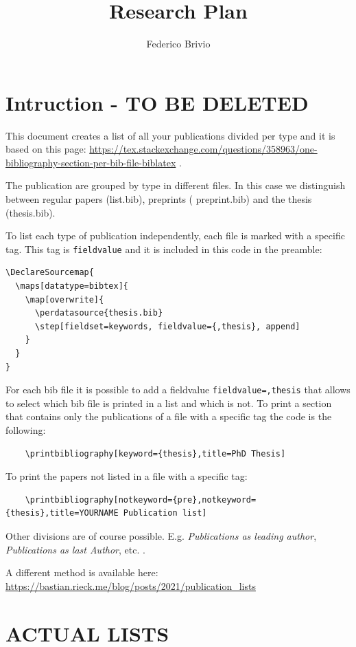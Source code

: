 \documentclass[10pt,a4paper]{article}
\title{Research Plan}
\author{Federico Brivio}
\date{}
\begin{document}
\section{Intruction - TO BE DELETED}
This document creates a list of all your publications divided per type and it is based on this page:
\href{https://tex.stackexchange.com/questions/358963/one-bibliography-section-per-bib-file-biblatex}{https://tex.stackexchange.com/questions/358963/one-bibliography-section-per-bib-file-biblatex} .

The publication are grouped by type in different files. In this case we distinguish between regular papers (list.bib), preprints ( preprint.bib) and the thesis (thesis.bib).

To list each type of publication independently, each file is marked with a specific tag.
This tag is \texttt{fieldvalue} and it is included in this code in the preamble:
\begin{verbatim}
\DeclareSourcemap{
  \maps[datatype=bibtex]{
    \map[overwrite]{
      \perdatasource{thesis.bib}
      \step[fieldset=keywords, fieldvalue={,thesis}, append]
    }
  }
}
\end{verbatim}
For each bib file it is possible to add a fieldvalue \texttt{fieldvalue={,thesis}} that allows to select which bib file is printed in a list and which is not.
To print a section that contains only the publications of a file with a specific tag the code is the following:
\begin{verbatim}
    \printbibliography[keyword={thesis},title=PhD Thesis]
\end{verbatim}
To print the papers not listed in a file with a specific tag:
\begin{verbatim}
    \printbibliography[notkeyword={pre},notkeyword={thesis},title=YOURNAME Publication list]
\end{verbatim}

Other divisions are of course possible. E.g. \textit{Publications as leading author}, \textit{Publications as last Author}, etc. .

A different method is available here: \href{https://bastian.rieck.me/blog/posts/2021/publication_lists/}{https://bastian.rieck.me/blog/posts/2021/publication\_lists}

\section{ACTUAL LISTS}
\end{document}
